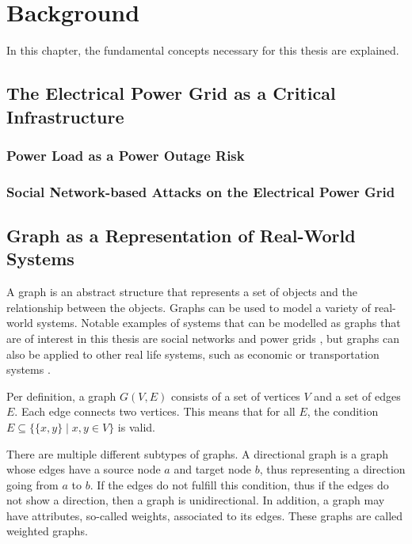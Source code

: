 \chapter{Background}
\label{background}

In this chapter, the fundamental concepts necessary for this thesis are explained.

\section{The Electrical Power Grid as a Critical Infrastructure}

\subsection{Power Load as a Power Outage Risk}

\subsection{Social Network-based Attacks on the Electrical Power Grid}

\section{Graph as a Representation of Real-World Systems}
\label{graphbasics}
A graph is an abstract structure that represents a set of objects and the relationship 
between the objects. Graphs can be used to model a variety of real-world systems.
Notable examples of systems that can be modelled as graphs that are of 
interest in this thesis are social networks 
\cite{socialgraphexample} and power grids \cite{powergraphexample}, but graphs can 
also be applied to other real life systems, such as economic 
or transportation systems \cite{economicsgraph}. %


Per definition, a graph $G(V, E)$ consists of a set of vertices $V$ and a 
set of edges $E$. Each edge connects two vertices. This means that for all $E$, the 
condition  $E \subseteq\{ \{x, y\} \mid x, y \in V  \}$ 
is valid.

There are multiple different subtypes of graphs. A directional graph is a graph 
whose edges have a source node $a$ and target node $b$, thus representing
a direction going from $a$ to $b$. If the edges do not fulfill this 
condition, thus if the edges do not show a direction, then a graph is unidirectional.
In addition, a graph may have attributes, so-called weights, associated to its edges.
These graphs are called weighted graphs.

